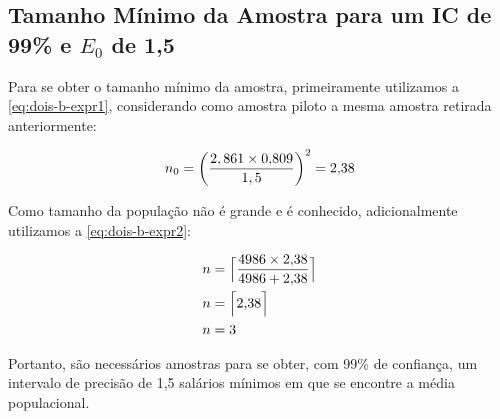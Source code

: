 \subsection{Tamanho Mínimo da Amostra para um IC de 99\% e $E_0$ de 1,5}

	Para se obter o tamanho mínimo da amostra, primeiramente utilizamos a
	\autoref{eq:dois-b-expr1}, considerando como amostra piloto a mesma
	amostra retirada anteriormente:

	\begin{align*}
		n_0 = \left (\frac{2,861 \times \TRESsd}{1,5} \right)^2 = \TRESnZero %
	\end{align*}

	Como tamanho da população não é grande e é conhecido, adicionalmente
	utilizamos a \autoref{eq:dois-b-expr2}:

	\begin{align*}
			n &= \Big\lceil \frac{\num{4986} \times \num{2.38}}{\num{4986} + \num{2.38}} \Big\rceil \\
			n &= \Big\lceil \num{2.38} \Big\rceil \\
			n &= \num{3}
	\end{align*}

Portanto, são necessários \TRESnZeroCorrigidoRounded amostras para se obter, com 99\% de confiança,
um intervalo de precisão de 1,5 salários mínimos em que se encontre a média populacional.
